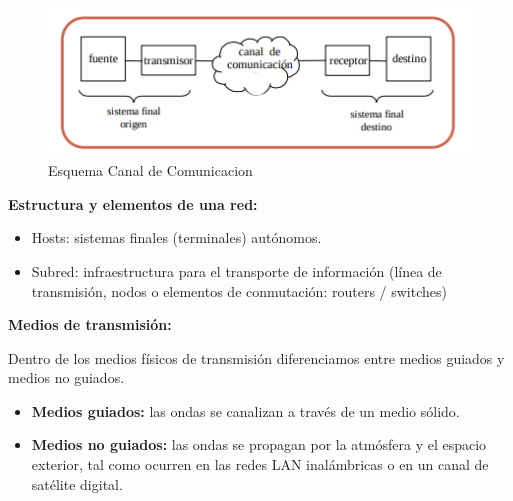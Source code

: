 \documentclass[a4paper,11pt]{article}
\begin{document}
\begin{figure}[h]
\centering
\includegraphics[scale=1,width=1\textwidth]{esquema_canal_comunicacion.png}
\caption{Esquema Canal de Comunicacion}
\end{figure}

\textbf{Estructura y elementos de una red:}
\begin{itemize}
\item Hosts: sistemas finales (terminales) autónomos.
\item Subred: infraestructura para el transporte de información (línea de transmisión, nodos o elementos de conmutación: routers / switches)
\end{itemize}

\textbf{Medios de transmisión:}

Dentro de los medios físicos de transmisión diferenciamos entre medios guiados y medios no guiados.

\begin{itemize}
\item \textbf{Medios guiados:} las ondas se canalizan a través de un medio sólido.
\item \textbf{Medios no guiados:} las ondas se propagan por la atmósfera y el espacio exterior, tal como ocurren en las redes LAN inalámbricas o en un canal de satélite digital.
\end{itemize}
\end{document}
